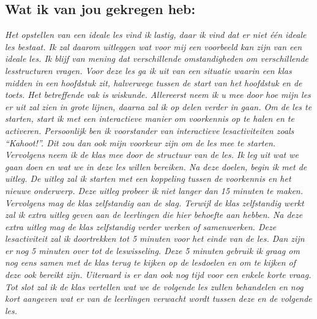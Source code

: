 \documentclass{article}
\begin{document}
        \subsection*{Wat ik van jou gekregen heb:}
            {\itshape             
                Het opstellen van een ideale les vind ik lastig, daar ik vind dat er niet één ideale les bestaat. Ik zal daarom uitleggen wat voor mij een voorbeeld kan zijn van een ideale les. Ik blijf van mening dat verschillende omstandigheden om verschillende lesstructuren vragen.
                Voor deze les ga ik uit van een situatie waarin een klas midden in een hoofdstuk zit, halverwege tussen de start van het hoofdstuk en de toets. Het betreffende vak is wiskunde.
                Allereerst neem ik u mee door hoe mijn les er uit zal zien in grote lijnen, daarna zal ik op delen verder in gaan.
                Om de les te starten, start ik met een interactieve manier om voorkennis op te halen en te activeren. Persoonlijk ben ik voorstander van interactieve lesactiviteiten zoals “Kahoot!”. Dit zou dan ook mijn voorkeur zijn om de les mee te starten. 
                Vervolgens neem ik de klas mee door de structuur van de les. Ik leg uit wat we gaan doen en wat we in deze les willen bereiken.
                Na deze doelen, begin ik met de uitleg. De uitleg zal ik starten met een koppeling tussen de voorkennis en het nieuwe onderwerp. Deze uitleg probeer ik niet langer dan 15 minuten te maken.
                Vervolgens mag de klas zelfstandig aan de slag. Terwijl de klas zelfstandig werkt zal ik extra uitleg geven aan de leerlingen die hier behoefte aan hebben. Na deze extra uitleg mag de klas zelfstandig verder werken of samenwerken. Deze lesactiviteit zal ik doortrekken tot 5 minuten voor het einde van de les.
                Dan zijn er nog 5 minuten over tot de leswisseling. Deze 5 minuten gebruik ik graag om nog eens samen met de klas terug te kijken op de lesdoelen en om te kijken of deze ook bereikt zijn. Uiteraard is er dan ook nog tijd voor een enkele korte vraag. Tot slot zal ik de klas vertellen wat we de volgende les zullen behandelen en nog kort aangeven wat er van de leerlingen verwacht wordt tussen deze en de volgende les.
                
}
\end{document}
